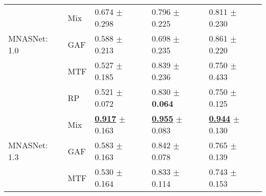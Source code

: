 \begin{tabular}[t]{lllll}
 & Mix & \textcolor[rgb]{0.5570023148,0.4429976852,0}{0.674} $\pm$ \textcolor[rgb]{1.0000000000,0.0000000000,0}{0.298} & \textcolor[rgb]{0.5976355483,0.4023644517,0}{0.796} $\pm$ \textcolor[rgb]{0.9362788663,0.0637211337,0}{0.225} & \textcolor[rgb]{0.3411102172,0.5000000000,0}{0.811} $\pm$ \textcolor[rgb]{0.3729254000,0.5000000000,0}{0.230} \\
MNASNet: 1.0 & GAF & \textcolor[rgb]{0.7543402778,0.2456597222,0}{0.588} $\pm$ \textcolor[rgb]{0.7152474728,0.2847525272,0}{0.213} & \textcolor[rgb]{0.9676133533,0.0323866467,0}{0.698} $\pm$ \textcolor[rgb]{0.9920961509,0.0079038491,0}{0.235} & \textcolor[rgb]{0.2123893805,0.5000000000,0}{0.861} $\pm$ \textcolor[rgb]{0.3434889631,0.5000000000,0}{0.220} \\
 & MTF & \textcolor[rgb]{0.8923611111,0.1076388889,0}{0.527} $\pm$ \textcolor[rgb]{0.6198605364,0.3801394636,0}{0.185} & \textcolor[rgb]{0.4349775785,0.5000000000,0}{0.839} $\pm$ \textcolor[rgb]{1.0000000000,0.0000000000,0}{0.236} & \textcolor[rgb]{0.4955752212,0.5000000000,0}{0.750} $\pm$ \textcolor[rgb]{1.0000000000,0.0000000000,0}{0.433} \\
 & RP & \textcolor[rgb]{0.9071180556,0.0928819444,0}{0.521} $\pm$ \textcolor[rgb]{0.2419612355,0.5000000000,0}{0.072} & \textcolor[rgb]{0.4713502740,0.5000000000,0}{0.830} $\pm$ \textbf{\textcolor[rgb]{0.0000000000,0.5000000000,0}{0.064}} & \textcolor[rgb]{0.4955752212,0.5000000000,0}{0.750} $\pm$ \textcolor[rgb]{0.0485555983,0.5000000000,0}{0.125} \\
 & Mix & \underline{\textbf{\textcolor[rgb]{0.0000000000,0.5000000000,0}{0.917}}} $\pm$ \textcolor[rgb]{0.5459381760,0.4540618240,0}{0.163} & \underline{\textbf{\textcolor[rgb]{0.0000000000,0.5000000000,0}{0.955}}} $\pm$ \textcolor[rgb]{0.1108637325,0.5000000000,0}{0.083} & \underline{\textbf{\textcolor[rgb]{0.0000000000,0.5000000000,0}{0.944}}} $\pm$ \textcolor[rgb]{0.0632276993,0.5000000000,0}{0.130} \\
MNASNet: 1.3 & GAF & \textcolor[rgb]{0.7638888889,0.2361111111,0}{0.583} $\pm$ \textcolor[rgb]{0.5459381760,0.4540618240,0}{0.163} & \textcolor[rgb]{0.4231553200,0.5000000000,0}{0.842} $\pm$ \textcolor[rgb]{0.0815616432,0.5000000000,0}{0.078} & \textcolor[rgb]{0.4569589702,0.5000000000,0}{0.765} $\pm$ \textcolor[rgb]{0.0903646116,0.5000000000,0}{0.139} \\
 & MTF & \textcolor[rgb]{0.8854166667,0.1145833333,0}{0.530} $\pm$ \textcolor[rgb]{0.5485317211,0.4514682789,0}{0.164} & \textcolor[rgb]{0.4573991031,0.5000000000,0}{0.833} $\pm$ \textcolor[rgb]{0.2906021337,0.5000000000,0}{0.114} & \textcolor[rgb]{0.5132743363,0.4867256637,0}{0.743} $\pm$ \textcolor[rgb]{0.1340058383,0.5000000000,0}{0.153} \\

\end{tabular}

